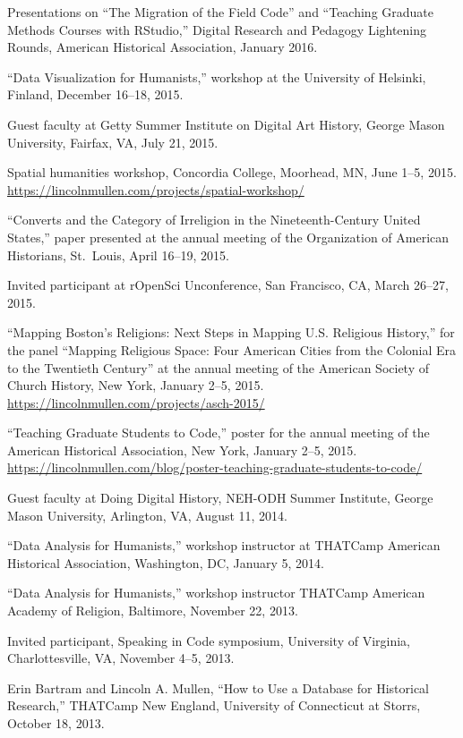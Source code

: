 \documentclass[11pt]{article}
\begin{document}
Presentations on ``The Migration of the Field Code'' and ``Teaching 
Graduate Methods Courses with RStudio,'' Digital Research and Pedagogy 
Lightening Rounds, American Historical Association, January 2016.

``Data Visualization for Humanists,'' workshop at the University of Helsinki, 
Finland, December 16--18, 2015. 

Guest faculty at Getty Summer Institute on 
Digital Art History, George Mason University, Fairfax, VA, July 21, 2015.

Spatial humanities workshop, Concordia College, Moorhead, MN, June 1--5, 2015.  
\url{https://lincolnmullen.com/projects/spatial-workshop/}

``Converts and the Category of Irreligion in the Nineteenth-Century
United States,'' paper presented at the annual meeting of the
Organization of American Historians, St.~Louis, April 16--19, 2015.

Invited participant at rOpenSci Unconference, San Francisco, CA, March 26--27, 2015.

``Mapping Boston's Religions: Next Steps in Mapping U.S. Religious History,'' 
for the panel ``Mapping Religious Space: Four American Cities from the 
Colonial Era to the Twentieth Century'' at the annual meeting of the American 
Society of Church History, New York, January 2--5, 2015.  
\url{https://lincolnmullen.com/projects/asch-2015/}

``Teaching Graduate Students to Code,'' poster for the annual meeting of the
American Historical Association, New York, January 2--5, 2015.
\url{https://lincolnmullen.com/blog/poster-teaching-graduate-students-to-code/}

Guest faculty at Doing Digital History, NEH-ODH 
Summer Institute, George Mason University, Arlington, VA, August 11, 2014.

``Data Analysis for Humanists,'' workshop instructor at THATCamp American Historical Association, 
Washington, DC, January 5, 2014.

``Data Analysis for Humanists,'' workshop instructor THATCamp American Academy of Religion, Baltimore, November 22, 2013.

Invited participant, Speaking in Code symposium, University of Virginia, 
Charlottesville, VA, November 4--5, 2013.

Erin Bartram and Lincoln A. Mullen, ``How to Use a Database for Historical 
Research,'' THATCamp New England, University of Connecticut at Storrs, October 
18, 2013.
\end{document}
